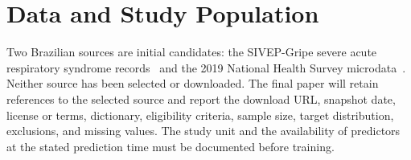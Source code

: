 \section{Data and Study Population}
Two Brazilian sources are initial candidates: the SIVEP-Gripe severe acute
respiratory syndrome records~\cite{msSivep} and the 2019 National Health
Survey microdata~\cite{ibgePns}. Neither source has been selected or downloaded.
The final paper will retain references to the selected source and report
the download URL, snapshot date, license or terms, dictionary, eligibility
criteria, sample size, target distribution, exclusions, and missing values.
The study unit and the availability of predictors at the stated prediction
time must be documented before training.
